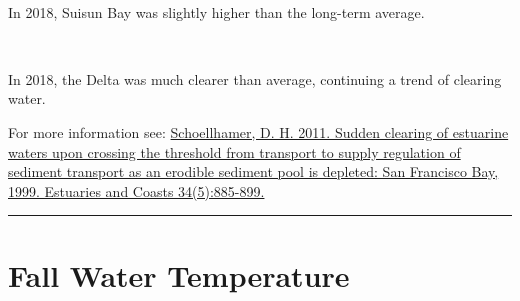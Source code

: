 \documentclass[
]{book}
\begin{document}
\begin{panel-grid}
\begin{columns-nocenter}
\begin{column40}
~

\end{column40}

\begin{column800}

In 2018, Suisun Bay was slightly higher than the long-term average.

\end{column800}

\begin{column40}

~

\end{column40}

\begin{column800}

In 2018, the Delta was much clearer than average, continuing a trend of clearing water.

\end{column800}

\end{columns-nocenter}

\end{panel-grid}

\begin{disclaimer}
For more information see:
\href{https://link.springer.com/article/10.1007/s12237-011-9382-x}{Schoellhamer,
D. H. 2011. Sudden clearing of estuarine waters upon crossing the
threshold from transport to supply regulation of sediment transport as
an erodible sediment pool is depleted: San Francisco Bay, 1999.
Estuaries and Coasts 34(5):885-899.}
\end{disclaimer}

\begin{center}\rule{0.5\linewidth}{0.5pt}\end{center}

\hypertarget{fall-water-temperature}{%
\section{Fall Water Temperature}\label{fall-water-temperature}}
\end{document}
